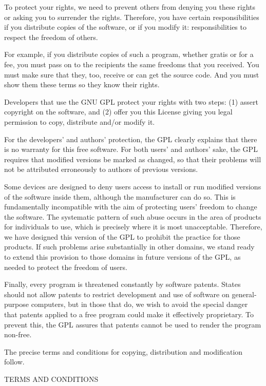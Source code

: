   To protect your rights, we need to prevent others from denying you
these rights or asking you to surrender the rights.  Therefore, you have
certain responsibilities if you distribute copies of the software, or if
you modify it: responsibilities to respect the freedom of others.

  For example, if you distribute copies of such a program, whether
gratis or for a fee, you must pass on to the recipients the same
freedoms that you received.  You must make sure that they, too, receive
or can get the source code.  And you must show them these terms so they
know their rights.

  Developers that use the GNU GPL protect your rights with two steps:
(1) assert copyright on the software, and (2) offer you this License
giving you legal permission to copy, distribute and/or modify it.

  For the developers' and authors' protection, the GPL clearly explains
that there is no warranty for this free software.  For both users' and
authors' sake, the GPL requires that modified versions be marked as
changed, so that their problems will not be attributed erroneously to
authors of previous versions.

  Some devices are designed to deny users access to install or run
modified versions of the software inside them, although the manufacturer
can do so.  This is fundamentally incompatible with the aim of
protecting users' freedom to change the software.  The systematic
pattern of such abuse occurs in the area of products for individuals to
use, which is precisely where it is most unacceptable.  Therefore, we
have designed this version of the GPL to prohibit the practice for those
products.  If such problems arise substantially in other domains, we
stand ready to extend this provision to those domains in future versions
of the GPL, as needed to protect the freedom of users.

  Finally, every program is threatened constantly by software patents.
States should not allow patents to restrict development and use of
software on general-purpose computers, but in those that do, we wish to
avoid the special danger that patents applied to a free program could
make it effectively proprietary.  To prevent this, the GPL assures that
patents cannot be used to render the program non-free.

  The precise terms and conditions for copying, distribution and
modification follow.

                       TERMS AND CONDITIONS

